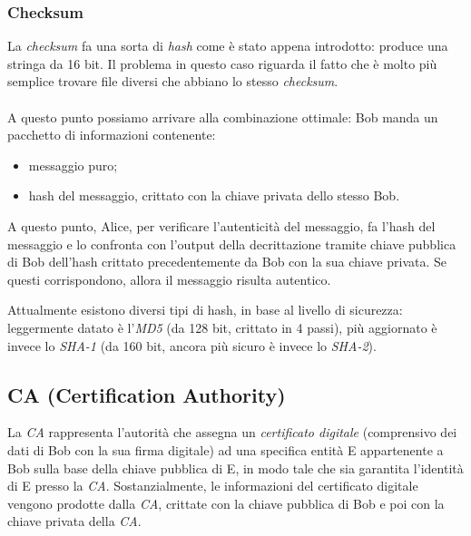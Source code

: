 \subsubsection{Checksum}
La \textit{checksum} fa una sorta di \textit{hash} come è stato appena introdotto: produce una stringa da 16 bit. Il problema in questo caso riguarda il fatto che è molto più semplice trovare file diversi che abbiano lo stesso \textit{checksum}.\\\\
A questo punto possiamo arrivare alla combinazione ottimale: Bob manda un pacchetto di informazioni contenente:
\begin{itemize}
	\item messaggio puro;
	\item hash del messaggio, crittato con la chiave privata dello stesso Bob.
\end{itemize}
A questo punto, Alice, per verificare l'autenticità del messaggio, fa l'hash del messaggio e lo confronta con l'output della decrittazione tramite chiave pubblica di Bob dell'hash crittato precedentemente da Bob con la sua chiave privata. Se questi corrispondono, allora il messaggio risulta autentico.

Attualmente esistono diversi tipi di hash, in base al livello di sicurezza: leggermente datato è l'\textit{MD5} (da 128 bit, crittato in 4 passi), più aggiornato è invece lo \textit{SHA-1} (da 160 bit, ancora più sicuro è invece lo \textit{SHA-2}).

\subsection{CA (Certification Authority)}
La \textit{CA} rappresenta l'autorità che assegna un \textit{certificato digitale} (comprensivo dei dati di Bob con la sua firma digitale) ad una specifica entità E appartenente a Bob sulla base della chiave pubblica di E, in modo tale che sia garantita l'identità di E presso la \textit{CA}. Sostanzialmente, le informazioni del certificato digitale vengono prodotte dalla \textit{CA}, crittate con la chiave pubblica di Bob e poi con la chiave privata della \textit{CA}.
\newpage

